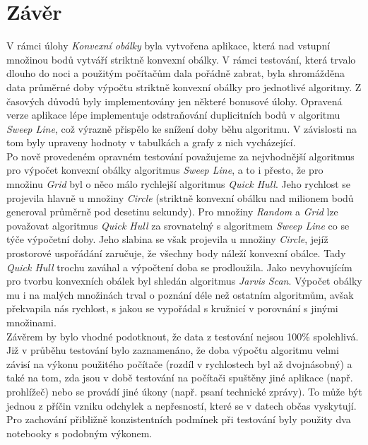 \documentclass[a4paper, 12pt]{article}
\begin{document}
\clearpage
\section{Závěr}
V rámci úlohy \textit{Konvexní obálky} byla vytvořena aplikace, která nad vstupní množinou bodů vytváří striktně konvexní obálky. V rámci testování, která trvalo dlouho do noci a použitým počítačům dala pořádně zabrat, byla shromážděna data průměrné doby výpočtu striktně konvexní obálky pro jednotlivé algoritmy. Z časových důvodů byly implementovány jen některé bonusové úlohy. Opravená verze aplikace lépe implementuje odstraňo\-vá\-ní duplicitních bodů v algoritmu \textit{Sweep Line}, což výrazně přispělo ke snížení doby běhu algoritmu. V závislosti na tom byly upraveny hodnoty v tabulkách a grafy z nich vycházející.\\

Po nově provedeném opravném testování považujeme za nejvhodnější algoritmus pro výpočet konvexní obálky algoritmus \textit{Sweep Line}, a to i přesto, že pro množinu \textit{Grid} byl o něco málo rychlejší algoritmus \textit{Quick Hull}. Jeho rychlost se projevila hlavně u množiny \textit{Circle} (striktně konvexní obálku nad milionem bodů generoval průměrně pod desetinu sekundy). Pro množiny \textit{Random} a \textit{Grid} lze považovat algoritmus \textit{Quick Hull} za srovnatelný s algoritmem \textit{Sweep Line} co se týče výpočetní doby. Jeho slabina se však projevila u množiny \textit{Circle}, jejíž prostorové uspořádání zaručuje, že všechny body náleží konvexní obálce. Tady \textit{Quick Hull} trochu zaváhal a výpočtení doba se prodloužila. Jako nevyhovujícím pro tvorbu konvexních obálek byl shledán algoritmus \textit{Jarvis Scan}. Výpočet obálky mu i na malých množinách trval o poznání déle než ostatním algoritmům, avšak překvapila nás rychlost, s jakou se vypořádal s kružnicí v porovnání s jinými množinami.\\

Závěrem by bylo vhodné podotknout, že data z testování nejsou 100\% spolehlivá. Již v průběhu testování bylo zaznamenáno, že doba výpočtu algoritmu velmi závisí na výkonu použitého počítače (rozdíl v rychlostech byl až dvojnásobný) a také na tom, zda jsou v době testování na počítači spuštěny jiné aplikace (např. prohlížeč) nebo se provádí jiné úkony (např. psaní technické zprávy). To může být jednou z příčin vzniku odchylek a nepřesností, které se v datech občas vyskytují. Pro zachování přibližně konzistentních podmínek při testování byly použity dva notebooky s podobným výkonem.\\
\end{document}
